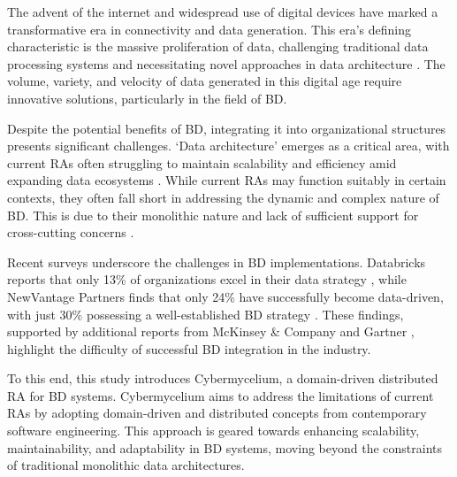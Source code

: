 \documentclass[review]{elsarticle}
\begin{document}
The advent of the internet and widespread use of digital devices have marked a transformative era in connectivity and data generation. This era's defining characteristic is the massive proliferation of data, challenging traditional data processing systems and necessitating novel approaches in data architecture \cite{AtaeiACIS,AtaeiBigDataEnvirons}. The volume, variety, and velocity of data generated in this digital age require innovative solutions, particularly in the field of BD.

Despite the potential benefits of BD, integrating it into organizational structures presents significant challenges. `Data architecture' emerges as a critical area, with current RAs often struggling to maintain scalability and efficiency amid expanding data ecosystems \cite{Gorton,Nadal}. While current RAs may function suitably in certain contexts, they often fall short in addressing the dynamic and complex nature of BD. This is due to their monolithic nature and lack of sufficient support for cross-cutting concerns \cite{ataei2023towards}.

Recent surveys underscore the challenges in BD implementations. Databricks reports that only 13\% of organizations excel in their data strategy \cite{DataBricksSurvey}, while NewVantage Partners finds that only 24\% have successfully become data-driven, with just 30\% possessing a well-established BD strategy \cite{NewVantageSurvey}. These findings, supported by additional reports from McKinsey \& Company \cite{analytics2016age} and Gartner \cite{Nash}, highlight the difficulty of successful BD integration in the industry.

To this end, this study introduces Cybermycelium, a domain-driven distributed RA for BD systems. Cybermycelium aims to address the limitations of current RAs by adopting domain-driven and distributed concepts from contemporary software engineering. This approach is geared towards enhancing scalability, maintainability, and adaptability in BD systems, moving beyond the constraints of traditional monolithic data architectures.

\end{document}
